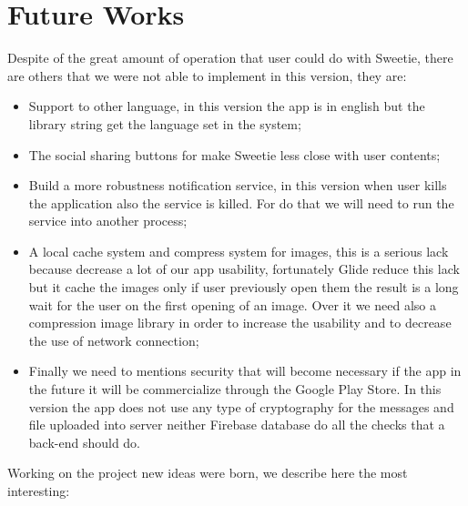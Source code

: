 
\section{Future Works}

Despite of the great amount of operation that user could do with Sweetie, there are others that we were not able to implement in this version, they are:

\begin{itemize}
	\item Support to other language, in this version the app is in english but the library string get the language set in the system;
	\item The social sharing buttons for make Sweetie less close with user contents;
	\item Build a more robustness notification service, in this version when user kills the application also the service is killed. For do that we will need to run the service into another process;
	\item A local cache system and compress system for images, this is a serious lack because decrease a lot of our  app usability, fortunately Glide reduce this lack but it cache the images only if user previously open them the result is a long wait for the user on the first opening of an image. Over it we need also a compression image library in order to increase the usability and to decrease the use of network connection;
	\item Finally we need to mentions security that will become necessary if the app in the future it will be commercialize through the Google Play Store. In this version the app does not use any type of cryptography for the messages and file uploaded into server neither Firebase database do all the checks that a back-end should do.
\end{itemize}

Working on the project new ideas were born, we describe here the most interesting:

